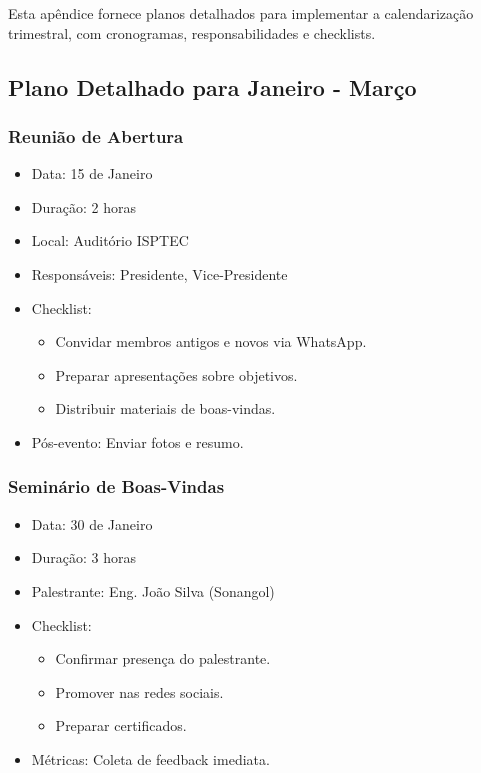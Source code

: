 \documentclass[12pt]{article}
\begin{document}
Esta apêndice fornece planos detalhados para implementar a calendarização trimestral, com cronogramas, responsabilidades e checklists.

\subsection{Plano Detalhado para Janeiro - Março}

\subsubsection{Reunião de Abertura}
\begin{itemize}
    \item Data: 15 de Janeiro
    \item Duração: 2 horas
    \item Local: Auditório ISPTEC
    \item Responsáveis: Presidente, Vice-Presidente
    \item Checklist:
      \begin{itemize}
        \item Convidar membros antigos e novos via WhatsApp.
        \item Preparar apresentações sobre objetivos.
        \item Distribuir materiais de boas-vindas.
      \end{itemize}
    \item Pós-evento: Enviar fotos e resumo.
\end{itemize}

\subsubsection{Seminário de Boas-Vindas}
\begin{itemize}
    \item Data: 30 de Janeiro
    \item Duração: 3 horas
    \item Palestrante: Eng. João Silva (Sonangol)
    \item Checklist:
      \begin{itemize}
        \item Confirmar presença do palestrante.
        \item Promover nas redes sociais.
        \item Preparar certificados.
      \end{itemize}
    \item Métricas: Coleta de feedback imediata.
\end{itemize}
\end{document}
